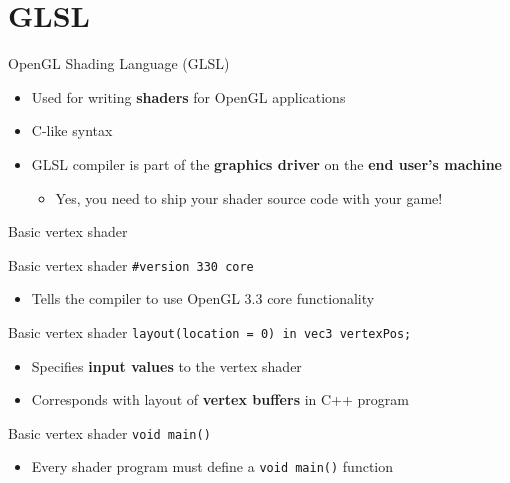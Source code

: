 \part{GLSL}
\frame{\partpage}

\begin{frame}{OpenGL Shading Language (GLSL)}
	\begin{itemize}
		\pause\item Used for writing \textbf{shaders} for OpenGL applications
		\pause\item C-like syntax
		\pause\item GLSL compiler is part of the \textbf{graphics driver}
			on the \textbf{end user's machine}
			\begin{itemize}
				\pause\item Yes, you need to ship your shader source code with your game!
			\end{itemize}
	\end{itemize}
\end{frame}

\begin{frame}{Basic vertex shader}
	
\end{frame}

\begin{frame}{Basic vertex shader}
	\lstinline{#version 330 core}
	\begin{itemize}
		\pause\item Tells the compiler to use OpenGL 3.3 core functionality
	\end{itemize}
\end{frame}

\begin{frame}{Basic vertex shader}
	\lstinline{layout(location = 0) in vec3 vertexPos;}
	\begin{itemize}
		\pause\item Specifies \textbf{input values} to the vertex shader
		\pause\item Corresponds with layout of \textbf{vertex buffers} in C++ program
	\end{itemize}
\end{frame}

\begin{frame}{Basic vertex shader}
	\lstinline{void main()}
	\begin{itemize}
		\pause\item Every shader program must define a \lstinline{void main()} function
	\end{itemize}
\end{frame}

